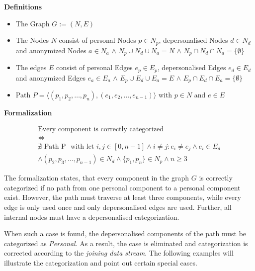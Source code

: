\begin{description}
	\item{\textbf{Definitions}}
	\begin{itemize}
		\item The Graph $G := (N, E)$
		\item The Nodes $N$ consist of personal Nodes $p \in N_p$, depersonalised Nodes $d \in N_d$ and anonymized Nodes $a \in N_a$ $\wedge$ $N_p \cup N_d \cup N_a = N$ $\wedge$ $N_p \cap N_d \cap N_a = \{ \emptyset \} $
		\item The edges $E$ consist of personal Edges $e_p \in E_p$, depersonalised Edges $e_d \in E_d$ and anonymized Edges $e_a \in E_a$ $\wedge$ $E_p \cup E_d \cup E_a = E$ $\wedge$ $E_p \cap E_d \cap E_a = \{ \emptyset \} $ 
		\item Path $P = \langle(p_1, p_2, \dots, p_n), (e_1, e_2, \dots, e_{n-1})\rangle$ with $p \in N$ and $e \in E$
	\end{itemize}

	\item{\textbf{Formalization}}
\end{description}
\begin{gather*}
	\textrm{Every component is correctly categorized}\\
	\Leftrightarrow\\
	\nexists \textrm{ Path P } \textrm{ with let } {i, j} \in [0, n-1] \wedge i \neq j: e_i \neq e_j \wedge e_i \in E_d \\
	\wedge (p_2, p_3, \dots, p_{n-1}) \in N_d \wedge \{ p_1, p_n \} \in N_p \wedge n \geq 3
\end{gather*}

The formalization states, that every component in the graph $G$ is correctly categorized if no path from one personal component to a personal component exist. However, the path must traverse at least three components, while every edge is only used once and only depersonalised edges are used. Further, all internal nodes must have a depersonalised categorization.

When such a case is found, the depersonalised components of the path must be categorized as \textit{Personal}. As a result, the case is eliminated and categorization is corrected according to the \textit{joining data stream}. The following examples will illustrate the categorization and point out certain special cases.

